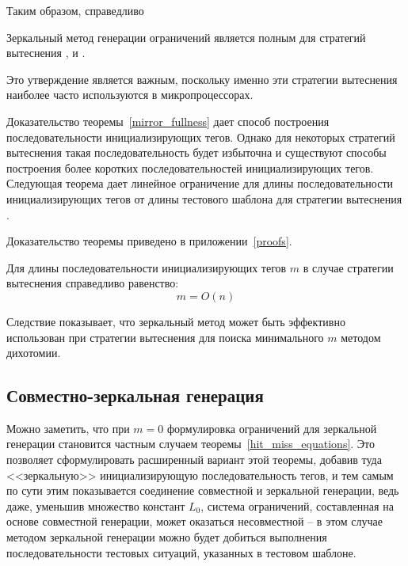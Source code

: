 Таким образом, справедливо

\begin{utv} Зеркальный метод генерации
ограничений является полным для стратегий вытеснения \LRU, \FIFO и
\PseudoLRU.
\end{utv}
Это утверждение является важным, поскольку именно эти стратегии
вытеснения наиболее часто используются в микропроцессорах.

Доказательство теоремы~\ref{mirror_fullness} дает способ построения
последовательности инициализирующих тегов. Однако для некоторых
стратегий вытеснения такая последовательность будет избыточна и
существуют способы построения более коротких последовательностей
инициализирующих тегов. Следующая теорема дает линейное ограничение
для длины последовательности инициализирующих тегов от длины
тестового шаблона для стратегии вытеснения \LRU.

\begin{theorem}\label{thm_mirror_lenth_lru} \UpperBoundLRUMirror
\end{theorem}
Доказательство теоремы приведено в приложении~\ref{proofs}.
\begin{sld}
    Для длины последовательности инициализирующих тегов $m$ в случае
    стратегии вытеснения \LRU справедливо равенство:
      $$m = O(n)$$
\end{sld}

Следствие показывает, что зеркальный метод может быть эффективно
использован при стратегии вытеснения \LRU для поиска минимального
$m$ методом дихотомии.

\subsection{Совместно-зеркальная генерация}

Можно заметить, что при $m = 0$ формулировка ограничений для
зеркальной генерации становится частным случаем
теоремы~\ref{hit_miss_equations}. Это позволяет сформулировать
расширенный вариант этой теоремы, добавив туда <<зеркальную>>
инициализирующую последовательность тегов, и тем самым по сути этим
показывается соединение совместной и зеркальной генерации, ведь
даже, уменьшив множество констант $L_0$, система ограничений,
составленная на основе совместной генерации, может оказаться
несовместной -- в этом случае методом зеркальной генерации можно
будет добиться выполнения последовательности тестовых ситуаций,
указанных в тестовом шаблоне.

